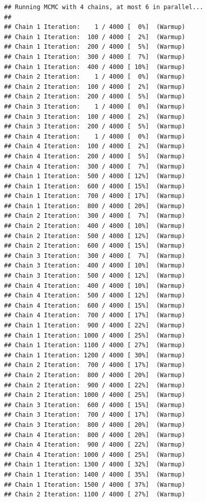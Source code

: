 \documentclass[
]{article}
\begin{document}
\begin{verbatim}
## Running MCMC with 4 chains, at most 6 in parallel...
## 
## Chain 1 Iteration:    1 / 4000 [  0%]  (Warmup) 
## Chain 1 Iteration:  100 / 4000 [  2%]  (Warmup) 
## Chain 1 Iteration:  200 / 4000 [  5%]  (Warmup) 
## Chain 1 Iteration:  300 / 4000 [  7%]  (Warmup) 
## Chain 1 Iteration:  400 / 4000 [ 10%]  (Warmup) 
## Chain 2 Iteration:    1 / 4000 [  0%]  (Warmup) 
## Chain 2 Iteration:  100 / 4000 [  2%]  (Warmup) 
## Chain 2 Iteration:  200 / 4000 [  5%]  (Warmup) 
## Chain 3 Iteration:    1 / 4000 [  0%]  (Warmup) 
## Chain 3 Iteration:  100 / 4000 [  2%]  (Warmup) 
## Chain 3 Iteration:  200 / 4000 [  5%]  (Warmup) 
## Chain 4 Iteration:    1 / 4000 [  0%]  (Warmup) 
## Chain 4 Iteration:  100 / 4000 [  2%]  (Warmup) 
## Chain 4 Iteration:  200 / 4000 [  5%]  (Warmup) 
## Chain 4 Iteration:  300 / 4000 [  7%]  (Warmup) 
## Chain 1 Iteration:  500 / 4000 [ 12%]  (Warmup) 
## Chain 1 Iteration:  600 / 4000 [ 15%]  (Warmup) 
## Chain 1 Iteration:  700 / 4000 [ 17%]  (Warmup) 
## Chain 1 Iteration:  800 / 4000 [ 20%]  (Warmup) 
## Chain 2 Iteration:  300 / 4000 [  7%]  (Warmup) 
## Chain 2 Iteration:  400 / 4000 [ 10%]  (Warmup) 
## Chain 2 Iteration:  500 / 4000 [ 12%]  (Warmup) 
## Chain 2 Iteration:  600 / 4000 [ 15%]  (Warmup) 
## Chain 3 Iteration:  300 / 4000 [  7%]  (Warmup) 
## Chain 3 Iteration:  400 / 4000 [ 10%]  (Warmup) 
## Chain 3 Iteration:  500 / 4000 [ 12%]  (Warmup) 
## Chain 4 Iteration:  400 / 4000 [ 10%]  (Warmup) 
## Chain 4 Iteration:  500 / 4000 [ 12%]  (Warmup) 
## Chain 4 Iteration:  600 / 4000 [ 15%]  (Warmup) 
## Chain 4 Iteration:  700 / 4000 [ 17%]  (Warmup) 
## Chain 1 Iteration:  900 / 4000 [ 22%]  (Warmup) 
## Chain 1 Iteration: 1000 / 4000 [ 25%]  (Warmup) 
## Chain 1 Iteration: 1100 / 4000 [ 27%]  (Warmup) 
## Chain 1 Iteration: 1200 / 4000 [ 30%]  (Warmup) 
## Chain 2 Iteration:  700 / 4000 [ 17%]  (Warmup) 
## Chain 2 Iteration:  800 / 4000 [ 20%]  (Warmup) 
## Chain 2 Iteration:  900 / 4000 [ 22%]  (Warmup) 
## Chain 2 Iteration: 1000 / 4000 [ 25%]  (Warmup) 
## Chain 3 Iteration:  600 / 4000 [ 15%]  (Warmup) 
## Chain 3 Iteration:  700 / 4000 [ 17%]  (Warmup) 
## Chain 3 Iteration:  800 / 4000 [ 20%]  (Warmup) 
## Chain 4 Iteration:  800 / 4000 [ 20%]  (Warmup) 
## Chain 4 Iteration:  900 / 4000 [ 22%]  (Warmup) 
## Chain 4 Iteration: 1000 / 4000 [ 25%]  (Warmup) 
## Chain 1 Iteration: 1300 / 4000 [ 32%]  (Warmup) 
## Chain 1 Iteration: 1400 / 4000 [ 35%]  (Warmup) 
## Chain 1 Iteration: 1500 / 4000 [ 37%]  (Warmup) 
## Chain 2 Iteration: 1100 / 4000 [ 27%]  (Warmup) 

\end{verbatim}
\end{document}

